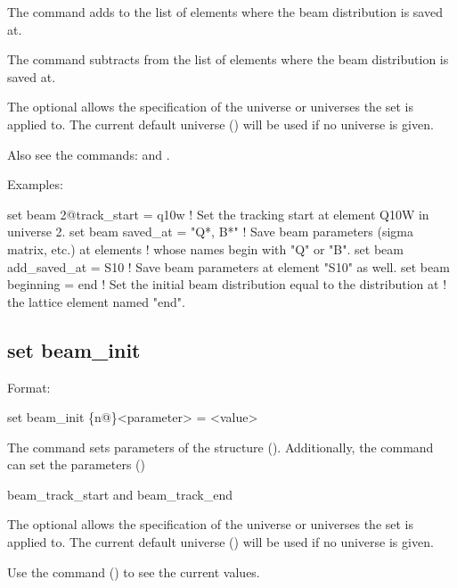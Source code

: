 {{The  command adds to the list of elements where the beam
distribution is saved at.

The  command subtracts from the list of elements where the beam
distribution is saved at.

The optional  allows the specification of the universe or universes the set is applied to.
The current default universe () will be used if no universe is given.

Also see the commands:  and .

Examples:
\begin{example}
  set beam 2@track_start = q10w  ! Set the tracking start at element Q10W in universe 2.
  set beam saved_at = "Q*, B*"   ! Save beam parameters (sigma matrix, etc.) at elements
                                 !  whose names begin with "Q" or "B".
  set beam add_saved_at = S10    ! Save beam parameters at element "S10" as well.
  set beam beginning = end       ! Set the initial beam distribution equal to the distribution at
                                 !  the lattice element named "end".
\end{example}


\subsection{set beam_init}
\label{s:set.beam.init}

Format:
\begin{example}
  set beam_init \{n@\}<parameter> = <value>
\end{example}

The  command sets parameters of the  structure ().
Additionally, the  command can set the parameters ()
\begin{example}
  beam_track_start  and
  beam_track_end
\end{example}

The optional  allows the specification of the universe or universes the set is applied to.
The current default universe () will be used if no universe is given.

Use the  command () to see the current values.

}}
